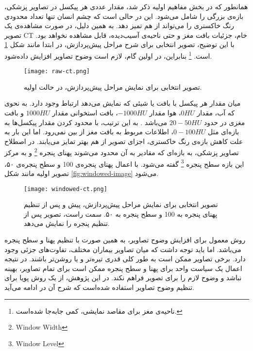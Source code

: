 همانطور که در بخش مفاهیم اولیه ذکر شد، مقدار عددی هر پیکسل در تصاویر پزشکی، بازه‌ی بزرگی را شامل می‌شود.
این در حالی است که چشم انسان تنها تعداد محدودی رنگ خاکستری را می‌تواند از هم تمیز دهد.
به همین دلیل، در صورت مشاهده‌ی یک تصویر CT خام، جزئیات بافت مغز و حتی ناحیه‌ی آسیب‌دیده، قابل مشاهده نخواهد بود. 
با این توضیح، تصویر انتخابی برای شرح مراحل پیش‌پردازش، در ابتدا مانند 
شکل \ref{fig:raw-ct} است.
\footnote{ناحیه‌ی مغز برای مقاصد نمایشی، کمی جا‌به‌جا شده‌است.}
بنابراین، در اولین گام، لازم است وضوح تصاویر افزایش داده‌شود.\\

\begin{figure}[ht]
\centering
\texttt{[image: raw-ct.png]}
\caption[]{تصویر انتخابی برای نمایش مراحل پیش‌پردازش، در حالت اولیه.}
\label{fig:raw-ct}
\end{figure}

 میان مقدار هر پیکسل با بافت یا شیئی که نمایش می‌دهد ارتباط وجود دارد.
به نحوی که آب، مقدار $0 HU$، هوا مقدار $-1000 HU$، بافت استخوانی مقدار $1000 HU$ و بافت مغزی در حدود $20-50 HU$ می‌باشد \cite{kamalian2016computed}.
به این ترتیب، با محدود کردن مقدار پیکسل‌ها به بازه‌ای مثل $0-100 HU$، اطلاعات مربوط به بافت مغز از بین نمی‌رود.
اما این بار به علت کاهش بازه‌ی رنگ خاکستری، اجزای تصویر از هم بهتر تمایز می‌یابند.
در اصطلاح تصاویر پزشکی، به بازه‌ای که مقادیر به آن محدود می‌شوند پهنای پنجره 
\footnote{Window Width}
و به مرکز این بازه سطح پنجره 
\footnote{Window Level} گفته می‌شود.
با اعمال پهنای پنجره‌ی 100 و سطح پنجره‌ی ۵۰، تصویر اولیه مانند شکل 
\ref{fig:windowed-image}
می‌شود.\\

\begin{figure}[ht]
\centering
\texttt{[image: windowed-ct.png]}
\caption[]{تصویر انتخابی برای نمایش مراحل پیش‌پردازش، پیش و پس از تنظیم پهنای پنجره به 100 و سطح پنجره به ۵۰. سمت راست، تصویر پس از تنظیم پنجره را نمایش می‌دهد.}
\label{fig:windowed-ct}
\end{figure}

روش معمول برای افزایش وضوح تصاویر، به همین صورت با تنظیم پهنا و سطح پنجره می‌باشد.
اما باید توجه داشت که میان تصاویر بیماران مختلف، تفاوت‌های جزئی وجود دارد.
برخی تصاویر ممکن است به طور کلی قدری تیره‌تر و یا روشن‌تر باشند.
در نتیجه اعمال یک سیاست واحد برای پهنا و سطح پنجره ممکن است برای تمام تصاویر، بهینه نباشد و وضوح لازم را برای تصویر فراهم نکند.
در این پژوهش، از یک روش پویا برای تنظیم وضوح تصاویر استفاده شده‌است که شرح آن در ادامه می‌آید.\\


